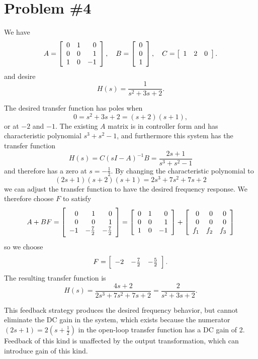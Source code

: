 \documentclass{article}
\begin{document}
\section*{Problem \#4}
We have
$$
A =
\left[\begin{array}{r r r}
  0 & 1 &  0 \\
  0 & 0 &  1 \\
  1 & 0 & -1
\end{array}\right], \quad
B =
\left[\begin{array}{r}
  0 \\
  0 \\
  1
\end{array}\right], \quad
C =
\left[\begin{array}{r r r}
  1 & 2 &  0
\end{array}\right].
$$
and desire
$$
H(s) = \frac{1}{s^2 + 3s + 2}.
$$

The desired transfer function has poles when
$$
0 = s^2 + 3s + 2 = (s + 2)(s + 1),
$$
or at $-2$ and $-1$. The existing $A$ matrix is in controller form and
has characteristic polynomial $s^3 + s^2 - 1$, and furthermore this
system has the transfer function
$$
H(s) = C (sI - A)^{-1} B =
\frac{2s + 1}{s^3 + s^2 - 1}
$$
and therefore has a zero at $s = -\frac{1}{2}$. By changing the
characteristic polynomial to
$$
(2s + 1)(s + 2)(s + 1) = 2s^3 + 7s^2 + 7s + 2
$$
we can adjust the transfer function to have the desired frequency
response. We therefore choose $F$ to satisfy
$$
A + BF =
\left[\begin{array}{r r r}
   0 &            1 &            0 \\
   0 &            0 &            1 \\
  -1 & -\frac{7}{2} & -\frac{7}{2}
\end{array}\right]
=
\left[\begin{array}{r r r}
  0 & 1 &  0 \\
  0 & 0 &  1 \\
  1 & 0 & -1
\end{array}\right]
+
\left[\begin{array}{r r r}
  0   &   0 &  0 \\
  0   &   0 &  0 \\
  f_1 & f_2 & f_3
\end{array}\right]
$$
so we choose
$$
F =
\left[\begin{array}{r r r}
  -2 & -\frac{7}{2} & -\frac{5}{2}
\end{array}\right].
$$
The resulting transfer function is
$$
H(s) = \frac{4s + 2}{2s^3 + 7s^2 + 7s + 2}
     = \frac{2}{s^2 + 3s + 2}.
$$

This feedback strategy produces the desired frequency behavior, but
cannot eliminate the DC gain in the system,
which exists because the numerator $(2s + 1) = 2(s + \frac{1}{2})$ in the open-loop
transfer function has a DC gain of 2. Feedback of this kind is
unaffected by the output transformation, which can introduce gain of
this kind.
\end{document}
